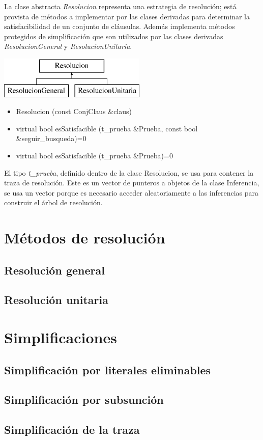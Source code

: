 \documentclass[a4paper,12pt]{article}
\begin{document}
La clase abstracta \emph{Resolucion} representa una estrategia de resolución; está provista de métodos a 
implementar por las clases derivadas para determinar la satisfacibilidad de un conjunto de cláusulas. 
Además implementa métodos protegidos de simplificación que son utilizados por las clases derivadas \emph{ResolucionGeneral}
y \emph{ResolucionUnitaria}.
\begin{center}
\leavevmode
\includegraphics[height=2cm]{imagenes/classResolucion}
\end{center}
\begin{itemize}
\renewcommand{\labelitemi}{$\bullet$}
\item Resolucion (const ConjClaus \&claus)
\item virtual bool esSatisfacible (t\_prueba \&Prueba, const bool \&seguir\_busqueda)=0
\item virtual bool esSatisfacible (t\_prueba \&Prueba)=0
\end{itemize}
El tipo \emph{t\_prueba}, definido dentro de la clase Resolucion, se usa para contener la traza de
resolución. Este es un vector de punteros a objetos de la clase Inferencia, se usa un vector porque
es necesario acceder aleatoriamente a las inferencias para construir el árbol de resolución.
\section{Métodos de resolución}
\subsection{Resolución general}
\subsection{Resolución unitaria}
\section{Simplificaciones}
\subsection{Simplificación por literales eliminables}
\subsection{Simplificación por subsunción}
\subsection{Simplificación de la traza}


\end{document}
